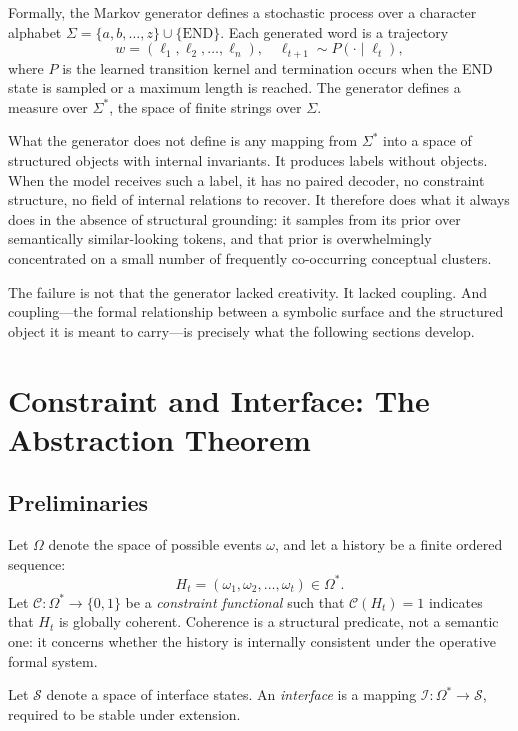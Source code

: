 \documentclass[12pt, a4paper]{article}
\theoremstyle{plain}
\theoremstyle{definition}
\theoremstyle{remark}
\begin{document}
Formally, the Markov generator defines a stochastic process over a character alphabet $\Sigma = \{a, b, \dots, z\} \cup \{\mathrm{END}\}$. Each generated word is a trajectory
\[
w = (\ell_1, \ell_2, \dots, \ell_n), \quad \ell_{t+1} \sim P(\cdot \mid \ell_t),
\]
where $P$ is the learned transition kernel and termination occurs when the END state is sampled or a maximum length is reached. The generator defines a measure over $\Sigma^*$, the space of finite strings over $\Sigma$.

What the generator does not define is any mapping from $\Sigma^*$ into a space of structured objects with internal invariants. It produces labels without objects. When the model receives such a label, it has no paired decoder, no constraint structure, no field of internal relations to recover. It therefore does what it always does in the absence of structural grounding: it samples from its prior over semantically similar-looking tokens, and that prior is overwhelmingly concentrated on a small number of frequently co-occurring conceptual clusters.

The failure is not that the generator lacked creativity. It lacked coupling. And coupling---the formal relationship between a symbolic surface and the structured object it is meant to carry---is precisely what the following sections develop.

\section{Constraint and Interface: The Abstraction Theorem}

\subsection{Preliminaries}

Let $\Omega$ denote the space of possible events $\omega$, and let a history be a finite ordered sequence:
\[
H_t = (\omega_1, \omega_2, \dots, \omega_t) \in \Omega^*.
\]
Let $\mathcal{C} : \Omega^* \to \{0,1\}$ be a \emph{constraint functional} such that $\mathcal{C}(H_t) = 1$ indicates that $H_t$ is globally coherent. Coherence is a structural predicate, not a semantic one: it concerns whether the history is internally consistent under the operative formal system.

Let $\mathcal{S}$ denote a space of interface states. An \emph{interface} is a mapping $\mathcal{I} : \Omega^* \to \mathcal{S}$, required to be stable under extension.
\end{document}
